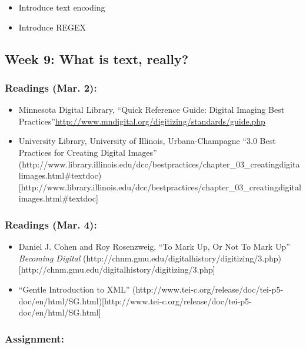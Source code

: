 \documentclass[]{article}
\begin{document}
\begin{itemize}
\itemsep1pt\parskip0pt
\item
  Introduce text encoding
\item
  Introduce REGEX
\end{itemize}

\subsection{Week 9: What is text,
really?}\label{week-9-what-is-text-really}

\subsubsection{Readings (Mar. 2):}\label{readings-mar.-2}

\begin{itemize}
\itemsep1pt\parskip0pt
\item
  Minnesota Digital Library, ``Quick Reference Guide: Digital Imaging
  Best
  Practices''\url{http://www.mndigital.org/digitizing/standards/guide.php}
\item
  University Library, University of Illinois, Urbana-Champagne ``3.0
  Best Practices for Creating Digital Images''
  (http://www.library.illinois.edu/dcc/bestpractices/chapter\_03\_creatingdigitalimages.html\#textdoc){[}http://www.library.illinois.edu/dcc/bestpractices/chapter\_03\_creatingdigitalimages.html\#textdoc{]}
\end{itemize}

\subsubsection{Readings (Mar. 4):}\label{readings-mar.-4}

\begin{itemize}
\itemsep1pt\parskip0pt
\item
  Daniel J. Cohen and Roy Rosenzweig, ``To Mark Up, Or Not To Mark Up''
  \emph{Becoming Digital}
  (http://chnm.gmu.edu/digitalhistory/digitizing/3.php){[}http://chnm.gmu.edu/digitalhistory/digitizing/3.php{]}
\item
  ``Gentle Introduction to XML''
  (http://www.tei-c.org/release/doc/tei-p5-doc/en/html/SG.html){[}http://www.tei-c.org/release/doc/tei-p5-doc/en/html/SG.html{]}
\end{itemize}

\subsubsection{Assignment:}\label{assignment-7}
\end{document}
